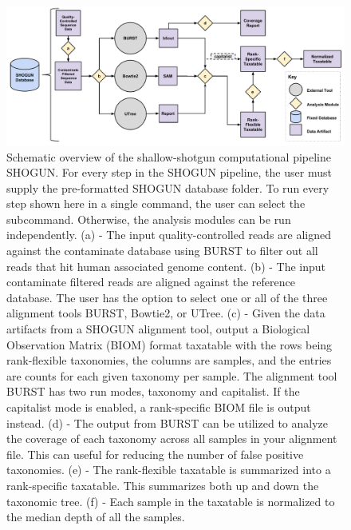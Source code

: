 \begin{figure}[hbt]
    \centering
    \includegraphics[width=0.8\linewidth]{fig/shogun_schematic.pdf}
    \caption{
        Schematic overview of the shallow-shotgun computational pipeline SHOGUN. For every step in the SHOGUN pipeline, the user must supply the pre-formatted SHOGUN database folder. To run every step shown here in a single command, the user can select the  subcommand. Otherwise, the analysis modules can be run independently. (a)  - The input quality-controlled reads are aligned against the contaminate database using BURST to filter out all reads that hit human associated genome content. (b)  - The input contaminate filtered reads are aligned against the reference database. The user has the option to select one or all of the three alignment tools BURST, Bowtie2, or UTree. (c)  - Given the data artifacts from a SHOGUN alignment tool, output a Biological Observation Matrix (BIOM) \cite{mcdonald_biological_2012} format taxatable with the rows being rank-flexible taxonomies, the columns are samples, and the entries are counts for each given taxonomy per sample. The alignment tool BURST has two run modes, taxonomy and capitalist. If the capitalist mode is enabled, a rank-specific BIOM file is output instead. (d)  - The output from BURST can be utilized to analyze the coverage of each taxonomy across all samples in your alignment file. This can useful for reducing the number of false positive taxonomies. (e)  - The rank-flexible taxatable is summarized into a rank-specific taxatable. This summarizes both up and down the taxonomic tree. (f)  - Each sample in the taxatable is normalized to the median depth of all the samples.
    }
    \label{fig:shogun_schematic}
\end{figure}

